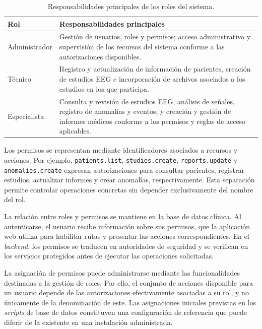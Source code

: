 \begin{table}[H]
\centering
\caption{Responsabilidades principales de los roles del sistema.}
\label{tab:roles-permisos}
\small
\begin{tabular}{|p{}|p{}|}
\hline
\textbf{Rol} & \textbf{Responsabilidades principales} \\ \hline
Administrador & Gestión de usuarios, roles y permisos; acceso administrativo y supervisión de los recursos del sistema conforme a las autorizaciones disponibles. \\ \hline
Técnico & Registro y actualización de información de pacientes, creación de estudios EEG e incorporación de archivos asociados a los estudios en los que participa. \\ \hline
Especialista & Consulta y revisión de estudios EEG, análisis de señales, registro de anomalías y eventos, y creación y gestión de informes médicos conforme a los permisos y reglas de acceso aplicables. \\ \hline
\end{tabular}
\end{table}

Los permisos se representan mediante identificadores asociados a recursos y acciones. Por ejemplo, \texttt{patients.list}, \texttt{studies.create}, \texttt{reports.update} y \texttt{anomalies.create} expresan autorizaciones para consultar pacientes, registrar estudios, actualizar informes y crear anomalías, respectivamente. Esta separación permite controlar operaciones concretas sin depender exclusivamente del nombre del rol.

La relación entre roles y permisos se mantiene en la base de datos clínica. Al autenticarse, el usuario recibe información sobre sus permisos, que la aplicación web utiliza para habilitar rutas y presentar las acciones correspondientes. En el \textit{backend}, los permisos se traducen en autoridades de seguridad y se verifican en los servicios protegidos antes de ejecutar las operaciones solicitadas.

La asignación de permisos puede administrarse mediante las funcionalidades destinadas a la gestión de roles. Por ello, el conjunto de acciones disponible para un usuario depende de las autorizaciones efectivamente asociadas a su rol, y no únicamente de la denominación de este. Las asignaciones iniciales previstas en los \textit{scripts} de base de datos constituyen una configuración de referencia que puede diferir de la existente en una instalación administrada.

